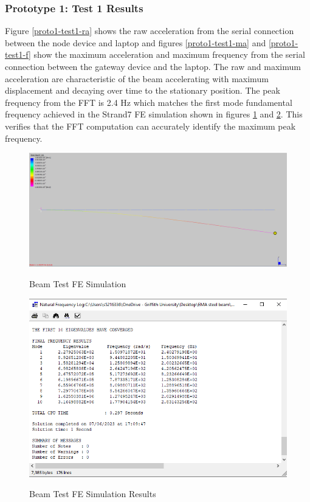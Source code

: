\subsubsection{Prototype 1: Test 1 Results}
Figure \ref{proto1-test1-ra} shows the raw acceleration from the serial connection between the node device and laptop and figures \ref{proto1-test1-ma} and \ref{proto1-test1-f} show the maximum acceleration and maximum frequency from the serial connection between the gateway device and the laptop. The raw and maximum acceleration are characteristic of the beam accelerating with maximum displacement and decaying over time to the stationary position. The peak frequency from the FFT is 2.4 Hz which matches the first mode fundamental frequency achieved in the Strand7 FE simulation shown in figures \ref{strand7-simulation} and \ref{strand7-results}. This verifies that the FFT computation can accurately identify the maximum peak frequency. 

\begin{figure}[H]
	\centering
	\caption{Beam Test FE Simulation}
	\includegraphics[width=\textwidth]{Sections/Prototype-Testing/strand7-simulation.png}
	\label{strand7-simulation}
\end{figure}

\begin{figure}[H]
	\centering
	\caption{Beam Test FE Simulation Results}
	\includegraphics[width=\textwidth]{Sections/Prototype-Testing/strand7-results.png}
	\label{strand7-results}
\end{figure}


